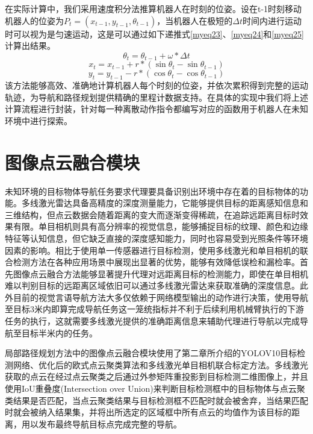 在实际计算中，我们采用速度积分法推算机器人在时刻的位姿。设在t-1时刻移动机器人的位姿为${P_t} = \left( {{x_{t - 1}},{y_{t - 1}},{\theta _{t - 1}}} \right)$，当机器人在极短的$\Delta t$时间内进行运动时可以视为是匀速运动，这是可以通过如下递推式\eqref{myeq23}、\eqref{myeq24}和\eqref{myeq25}计算出结果。
\begin{equation}
{\theta _t} = {\theta _{t - 1}} + \omega  * \Delta t
    \label{myeq23}
\end{equation}
\begin{equation}
    {x_t} = {x_{t - 1}} + r * \left( {\sin {\theta _t} - \sin {\theta _{t - 1}}} \right)
    \label{myeq24}
\end{equation}
\begin{equation}
{y_t} = {y_{t - 1}} - r * \left( {\cos {\theta _t} - \cos {\theta _{t - 1}}} \right)
    \label{myeq25}
\end{equation}
该方法能够高效、准确地计算机器人每个时刻的位姿，并依次累积得到完整的运动轨迹，为导航和路径规划提供精确的里程计数据支持。在具体的实现中我们将上述计算流程进行封装，针对每一种离散动作指令都编写对应的函数用于机器人在未知环境中进行探索。

\section{图像点云融合模块}
未知环境的目标物体导航任务要求代理要具备识别出环境中存在着的目标物体的功能。多线激光雷达具备高精度的深度测量能力，它能够提供目标的距离感知信息和三维结构，但点云数据会随着距离的变大而逐渐变得稀疏，在追踪远距离目标时效果有限。单目相机则具有高分辨率的视觉信息，能够捕捉目标的纹理、颜色和边缘特征等认知信息，但它缺乏直接的深度感知能力，同时也容易受到光照条件等环境因素的影响。相比于使用单一传感器进行目标检测，使用多线激光和单目相机的联合检测方法在各种应用场景中展现出显著的优势，能够有效降低误检和漏检率。首先图像点云融合方法能够显著提升代理对远距离目标的检测能力，即使在单目相机难以判别目标的远距离区域依旧可以通过多线激光雷达来获取准确的深度信息。此外目前的视觉言语导航方法大多仅依赖于网络模型输出的动作进行决策，使用导航至目标3米内即算完成导航任务这一笼统指标并不利于后续利用机械臂执行的下游任务的执行，这就需要多线激光提供的准确距离信息来辅助代理进行导航以完成导航至目标半米内的任务。

局部路径规划方法中的图像点云融合模块使用了第二章所介绍的YOLOV10目标检测网络、优化后的欧式点云聚类算法和多线激光单目相机联合标定方法。多线激光获取的点云在经过点云聚类之后通过外参矩阵重投影到目标检测二维图像上，并且使用IoU重叠度(Intersection over Union)来判断目标检测框中的目标物体与点云聚类结果是否匹配，当点云聚类结果与目标检测框不匹配时就会被舍弃，当结果匹配时就会被纳入结果集，并将出所选定的区域框中所有点云的均值作为该目标的距离，用以发布最终导航目标点完成完整的导航。

